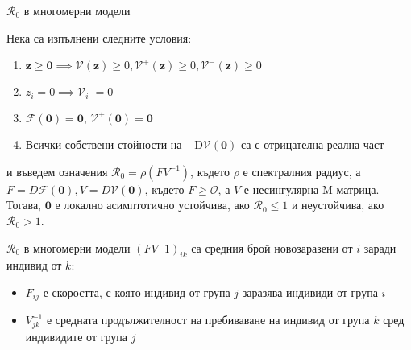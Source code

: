 \begin{frame}[t]{$\mathscr{R}_0$ в многомерни модели}
  \begin{theorem}
    Нека са изпълнени следните условия:
    \begin{enumerate}
      \item $\boldsymbol{z} \geq \boldsymbol{0} \implies \mathscr{V}(\boldsymbol{z}) \geq 0, \mathscr{V}^+(\boldsymbol{z}) \geq 0, \mathscr{V}^-(\boldsymbol{z}) \geq 0$
      \item $z_i = 0 \implies \mathscr{V}_{i}^- = 0$
      \item $\mathscr{F}(\boldsymbol{0}) = \boldsymbol{0}$, $\mathscr{V}^+(\boldsymbol{0}) = \boldsymbol{0}$
      \item Всички собствени стойности на $-\mathrm{D}\mathscr{V}{(\boldsymbol{0})}$ са с отрицателна реална част
    \end{enumerate}
    и въведем означения $\mathscr{R}_0 = \rho(F V^{-1})$, където $\rho$ е спектралния радиус, а $F = D\mathscr{F}(\boldsymbol{0}), V = D\mathscr{V}(\boldsymbol{0})$, където $F \geq \mathscr{O}$, а $V$ е несингулярна M-матрица. \\
    Тогава, $\boldsymbol{0}$ е локално асимптотично устойчива, ако $\mathscr{R}_0 \leq 1$ и неустойчива, ако $\mathscr{R}_0 > 1$.
  \end{theorem}
\end{frame}

\begin{frame}[t]{$\mathscr{R}_0$ в многомерни модели}
  $(F V^-1)_{ik}$ са средния брой новозаразени от $i$ заради индивид от $k$:
  \begin{itemize}
    \item $F_{ij}$ е скоростта, с която индивид от група $j$ заразява индивиди от група $i$
    \item $V^{-1}_{jk}$ е средната продължителност на пребиваване на индивид от група $k$ сред индивидите от група $j$
  \end{itemize}
\end{frame}
